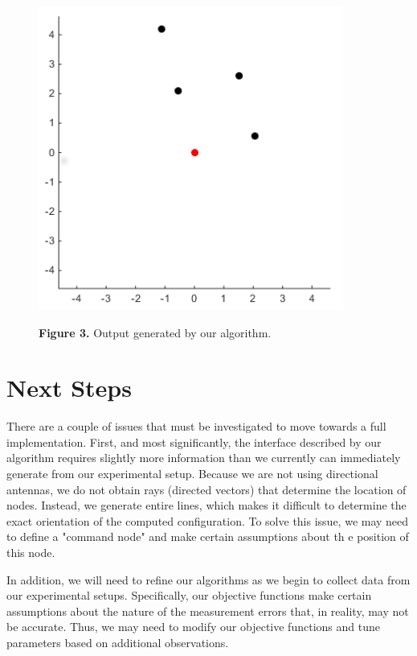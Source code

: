 \documentclass[12pt]{article}
\begin{document}
\begin{figure}[h]
\centering
\includegraphics[width=10cm]{figure3}

\footnotesize{\textbf{Figure 3.} Output generated by our algorithm.}
\end{figure}

\section{Next Steps}
There are a couple of issues that must be investigated to move towards a full implementation. First, and most significantly, the interface described by our algorithm requires slightly more information than we currently can immediately generate from our experimental setup. Because we are not using directional antennas, we do not obtain rays (directed vectors) that determine the location of nodes. Instead, we generate entire lines, which makes it difficult to determine the exact orientation of the computed configuration. To solve this issue, we may need to define a "command node" and make certain assumptions about th e position of this node. 

In addition, we will need to refine our algorithms as we begin to collect data from our experimental setups. Specifically, our objective functions make certain assumptions about the nature of the measurement errors that, in reality, may not be accurate. Thus, we may need to modify our objective functions and tune parameters based on additional observations.
\end{document}
